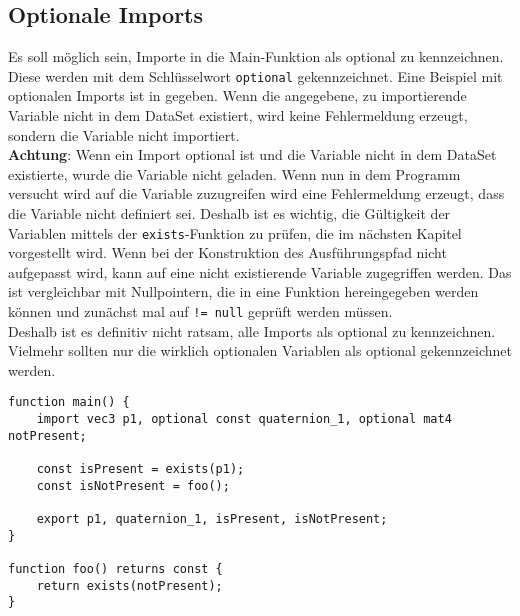 \subsection{Optionale Imports}
Es soll möglich sein, Importe in die Main-Funktion als optional zu kennzeichnen.
Diese werden mit dem Schlüsselwort \texttt{optional} gekennzeichnet.
Eine Beispiel mit optionalen Imports ist in  gegeben.
Wenn die angegebene, zu importierende Variable nicht in dem DataSet existiert, wird keine Fehlermeldung erzeugt, sondern die Variable nicht importiert.\\
\textbf{Achtung}: Wenn ein Import optional ist und die Variable nicht in dem DataSet existierte, wurde die Variable nicht geladen.
Wenn nun in dem Programm versucht wird auf die Variable zuzugreifen wird eine Fehlermeldung erzeugt, dass die Variable nicht definiert sei.
Deshalb ist es wichtig, die Gültigkeit der Variablen mittels der \texttt{exists}-Funktion zu prüfen, die im nächsten Kapitel vorgestellt wird.
Wenn bei der Konstruktion des Ausführungspfad nicht aufgepasst wird, kann auf eine nicht existierende Variable zugegriffen werden.
Das ist vergleichbar mit Nullpointern, die in eine Funktion hereingegeben werden können und zunächst mal auf \texttt{!= null} geprüft werden müssen.\\
Deshalb ist es definitiv nicht ratsam, alle Imports als optional zu kennzeichnen.
Vielmehr sollten nur die wirklich optionalen Variablen als optional gekennzeichnet werden.

\begin{lstlisting}[language=prepro, label={lst:OptionalImport}, caption={PrePro-Code mit optionalen Imports}, captionpos=b]
function main() {
	import vec3 p1, optional const quaternion_1, optional mat4 notPresent;

	const isPresent = exists(p1);
	const isNotPresent = foo();

	export p1, quaternion_1, isPresent, isNotPresent;
}

function foo() returns const {
	return exists(notPresent);
}
\end{lstlisting}

\label{sec:existsFunction}
